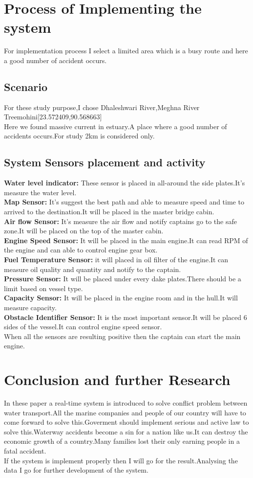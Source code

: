 \documentclass{article}
\begin{document}
\section{Process of Implementing the system}
For implementation process I select a limited area which is a busy route and here a good number of accident occurs\cite{awal2007marine}.
\subsection{Scenario}
For these study purpose,I chose Dhaleshwari River,Meghna River Treemohini[23.572409,90.568663]\\
Here we found massive current in estuary.A place where a good number of accidents occurs.For study 2km is considered only\cite{awal2007marine}.
\subsection{System Sensors placement and activity}
\textbf{Water level indicator:}
These sensor is placed in all-around the side plates.It's measure the water level.\\
\textbf{Map Sensor:}
It's suggest the best path and able to measure speed and time to arrived to the destination.It will be placed in the master bridge cabin.\\
\textbf{Air flow Sensor:}
It's measure the air flow and notify captains go to the safe zone.It will be placed on the top of the master cabin.\\
\textbf{Engine Speed Sensor: }
It will be placed in the main engine.It can read RPM of the engine and can able to control engine gear box.\\
\textbf{Fuel Temperature Sensor:}
it will placed in oil filter of the engine.It can measure oil quality and quantity and notify to the captain.\\
\textbf{Pressure Sensor:}
It will be placed under every dake plates.There should be a limit based on vessel type.\\
\textbf{Capacity Sensor:}
It will be placed in the engine room and in the hull.It will measure capacity.\\
\textbf{Obstacle Identifier Sensor:}
It is the most important sensor.It will be placed 6 sides of the vessel.It can control engine speed sensor.\\

When all the sensors are resulting positive then the captain can start the main engine.
\section{Conclusion and further Research}
In these paper a real-time system is introduced to solve conflict problem between water transport.All the marine companies and people of our country will have to come forward to solve this.Goverment should implement serious and active law to solve this.Waterway accidents become a sin for a nation like us.It can destroy the economic growth of a country.Many families lost their only earning people in a fatal accident.\\
If the system is implement properly then I will go for the result.Analysing the data I go for further development of the system.




\end{document}
